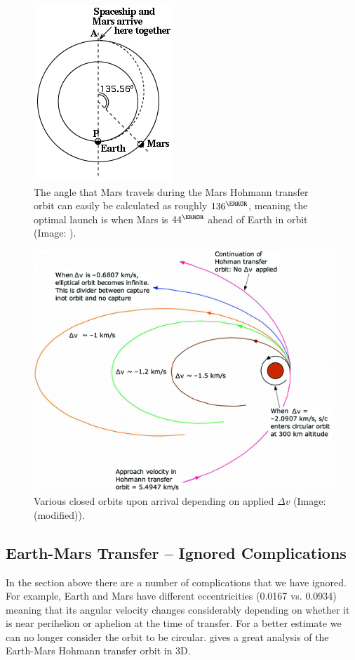 \begin{figure}[ht]
    \centering
    \includegraphics[width=0.35\linewidth]{fig/Hohmann-angle.png}
    \caption{The angle that Mars travels during the Mars Hohmann transfer orbit can easily be calculated as roughly \(136^\degree\), meaning the optimal launch is when Mars is \(44^\degree\) ahead of Earth in orbit (Image: \cite{Stern}).}
    \label{fig:Hohmann-angle}
\end{figure}

\begin{figure}[ht]
    \centering
    \includegraphics[width=0.85\linewidth]{fig/mars-arrival-orbit.png}
    \caption{Various closed orbits upon arrival depending on applied $\Delta v$ (Image: \cite[p.~137]{Rapp2016} (modified)).}
    \label{fig:mars-arrival-orbit}
\end{figure}

\clearpage

\subsection{Earth-Mars Transfer – Ignored Complications}
In the section above there are a number of complications that we have ignored. For example, Earth and Mars have different eccentricities (0.0167 vs. 0.0934) meaning that its angular velocity changes considerably depending on whether it is near perihelion or aphelion at the time of transfer. For a better estimate we can no longer consider the orbit to be circular. \cite{Braeuniga} gives a great analysis of the Earth-Mars Hohmann transfer orbit in 3D.



